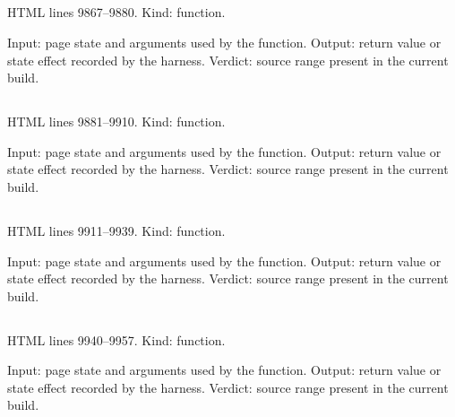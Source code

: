 \subsection*{\texttt{}}
\label{vf_543_curveColour}
HTML lines 9867--9880. Kind: function.

Input: page state and arguments used by the function.
Output: return value or state effect recorded by the harness.
Verdict: source range present in the current build.

\subsection*{\texttt{}}
\label{vf_544_renderReviewCurves}
HTML lines 9881--9910. Kind: function.

Input: page state and arguments used by the function.
Output: return value or state effect recorded by the harness.
Verdict: source range present in the current build.

\subsection*{\texttt{}}
\label{vf_545_drawAmplificationCurves}
HTML lines 9911--9939. Kind: function.

Input: page state and arguments used by the function.
Output: return value or state effect recorded by the harness.
Verdict: source range present in the current build.

\subsection*{\texttt{}}
\label{vf_546_bindCurveTip}
HTML lines 9940--9957. Kind: function.

Input: page state and arguments used by the function.
Output: return value or state effect recorded by the harness.
Verdict: source range present in the current build.

